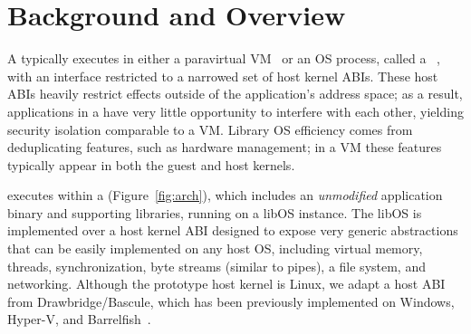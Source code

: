 \section{Background and Overview}
\label{sec:graphene:background}

A \libos{} typically executes in either a paravirtual VM~\citep{unikernels,osv}
or an OS process, called a {\em \picoproc{}}~\citep{porter11drawbridge,baumann13bascule},
with an interface restricted to a narrowed set of host kernel ABIs.
These host ABIs heavily restrict effects outside of the application's address space;
as a result, applications in a \picoproc{} have very little opportunity to interfere with each other,
yielding security isolation comparable to a VM.
Library OS efficiency comes from deduplicating features, such as hardware management;
in a VM these features typically appear in both the guest and host kernels.


\sysname{} executes within a \picoproc{} (Figure~\ref{fig:arch}),
which includes an {\em unmodified} application binary and supporting libraries, 
running on a libOS instance.
The libOS is implemented over a host kernel ABI
designed to expose very generic abstractions that can be easily 
implemented on any host OS, including virtual memory, threads, synchronization, byte streams (similar to pipes),
a file system, and networking.
Although the \sysname{} prototype  host kernel is Linux, 
we adapt a host ABI from Drawbridge/Bascule,
which has been previously implemented on Windows, Hyper-V, and Barrelfish~\citep{porter11drawbridge,baumann13bascule,baumann09barrelfish}.


